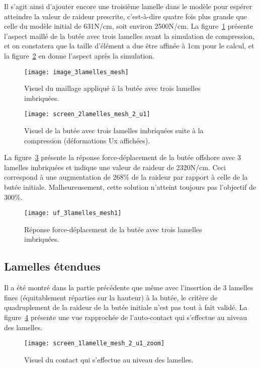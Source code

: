 ﻿\documentclass{article}
\newcommand{\cimg}{0.8}
\begin{document}
Il s'agit ainsi d'ajouter encore une troisième lamelle dans le modèle pour espérer atteindre la valeur de raideur prescrite, c'est-à-dire quatre fois plus grande que celle du modèle initial de 631N/cm, soit environ 2500N/cm. La figure~\ref{fig13} présente l'aspect maillé de la butée avec trois lamelles avant la simulation de compression, et on constatera que la taille d'élément a due être affinée à 1cm pour le calcul, et la figure~\ref{fig14} en donne l'aspect après la simulation.

\begin{figure}[!h]
	\centering
	\texttt{[image: image\_3lamelles\_mesh]}
	\caption{Visuel du maillage appliqué à la butée avec trois lamelles imbriquées.}
	\label{fig13}
\end{figure}

\begin{figure}[!h]
	\centering
	\texttt{[image: screen\_2lamelles\_mesh\_2\_u1]}
	\caption{Visuel de la butée avec trois lamelles imbriquées suite à la compression (déformations Ux affichées).}
	\label{fig14}
\end{figure}

La figure~\ref{fig15} présente la réponse force-déplacement de la butée offshore avec 3 lamelles imbriquées et indique une valeur de raideur de 2320N/cm. Ceci correspond à une augmentation de 268\% de la raideur par rapport à celle de la butée initiale. Malheureusement, cette solution n'atteint toujours pas l'objectif de 300\%.
 
\begin{figure}[!h]
	\centering
	\texttt{[image: uf\_3lamelles\_mesh1]}
	\caption{Réponse force-déplacement de la butée avec trois lamelles imbriquées.}
	\label{fig15}
\end{figure}

\subsection{Lamelles étendues}
Il a été montré dans la partie précédente que même avec l'insertion de 3 lamelles fines (équitablement réparties sur la hauteur) à la butée, le critère de quadruplement de la raideur de la butée initiale n'est pas tout à fait validé. La figure~\ref{fig16} présente une vue rapprochée de l'auto-contact qui s'effectue au niveau des lamelles.

\begin{figure}[!h]
	\centering
	\texttt{[image: screen\_1lamelle\_mesh\_2\_u1\_zoom]}
	\caption{Visuel du contact qui s'effectue au niveau des lamelles.}
	\label{fig16}
\end{figure}
\end{document}
